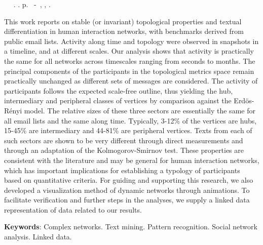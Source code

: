 \documentclass[
12pt,		%
openright,	%
twoside,  %
a4paper,			%
chapter=TITLE,		%
english,			%
french,				%
spanish,			%
brazil				%
]{USPSC}
\begin{document}
\begin{resumo}[Abstract]
	\begin{flushleft}\footnotesize 
		\setlength{\absparsep}{0pt} %
 		\SingleSpacing 
 		\imprimirautorabr~ ~\textbf{\imprimirtitleabstract}.	\imprimirdata.  \pageref{LastPage}p. 
		\imprimirtipotrabalho~-~\imprimirinstituicao, \imprimirlocal, 	\imprimirdata. 
 	\end{flushleft}
	\OnehalfSpacing 
	 This work reports on stable (or invariant) topological properties and textual differentiation in human interaction networks,
	 with benchmarks derived from public email lists.
	 Activity along time and topology were observed in snapshots in a timeline, and at
	 different scales. Our analysis shows that activity is practically the same for all networks across timescales
	 ranging from seconds to months. The principal components of the participants in the topological metrics
	 space remain practically unchanged as different sets of messages are considered.
	 The activity of participants
	 follows the expected scale-free outline, thus yielding the hub, intermediary and peripheral classes of vertices by
	 comparison against the Erdös-Rényi model.
	 The relative sizes of these three sectors are essentially the same
	 for all email lists and the same along time.
	 Typically, 3-12\% of the vertices are hubs, 15-45\% are intermediary
	 and 44-81\% are peripheral vertices.
	 Texts from each of such sectors are shown to be very different through direct measurements and through an adaptation of the Kolmogorov-Smirnov test.
	 These properties are consistent with the literature and may be general for human
	 interaction networks, which has important implications for establishing a typology of participants based on
	 quantitative criteria.
	 For guiding and supporting this research, we also developed a visualization method of dynamic networks through animations.
	 To facilitate verification and further steps in the analyses, we supply a linked data representation of data related to our results.
   \vspace{\onelineskip}
 
   \noindent 
   \textbf{Keywords}: Complex networks. Text mining. Pattern recognition. Social network analysis. Linked data.
\end{resumo}
\end{document}
